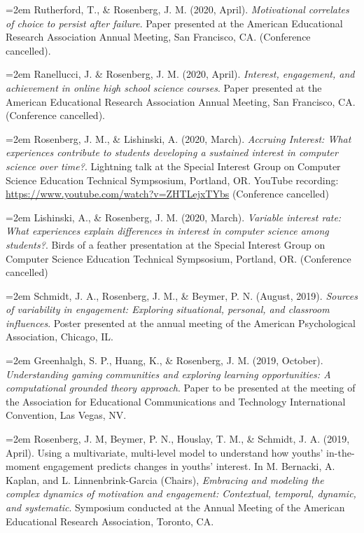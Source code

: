 \documentclass[
  11pt,
]{article}
\begin{document}
\hangindent=2em Rutherford, T., \& Rosenberg, J. M. (2020, April).
\emph{Motivational correlates of choice to persist after failure}. Paper
presented at the American Educational Research Association Annual
Meeting, San Francisco, CA. (Conference cancelled).

\hangindent=2em Ranellucci, J. \& Rosenberg, J. M. (2020, April).
\emph{Interest, engagement, and achievement in online high school
science courses}. Paper presented at the American Educational Research
Association Annual Meeting, San Francisco, CA. (Conference cancelled).

\hangindent=2em Rosenberg, J. M., \& Lishinski, A. (2020, March).
\emph{Accruing Interest: What experiences contribute to students
developing a sustained interest in computer science over time?}.
Lightning talk at the Special Interest Group on Computer Science
Education Technical Sympsosium, Portland, OR. YouTube recording:
\url{https://www.youtube.com/watch?v=ZHTLejxTYbs} (Conference cancelled)

\hangindent=2em Lishinski, A., \& Rosenberg, J. M. (2020, March).
\emph{Variable interest rate: What experiences explain differences in
interest in computer science among students?}. Birds of a feather
presentation at the Special Interest Group on Computer Science Education
Technical Sympsosium, Portland, OR. (Conference cancelled)

\hangindent=2em Schmidt, J. A., Rosenberg, J. M., \& Beymer, P. N.
(August, 2019). \emph{Sources of variability in engagement: Exploring
situational, personal, and classroom influences}. Poster presented at
the annual meeting of the American Psychological Association, Chicago,
IL.

\hangindent=2em Greenhalgh, S. P., Huang, K., \& Rosenberg, J. M. (2019,
October). \emph{Understanding gaming communities and exploring learning
opportunities: A computational grounded theory approach}. Paper to be
presented at the meeting of the Association for Educational
Communications and Technology International Convention, Las Vegas, NV.

\hangindent=2em Rosenberg, J. M, Beymer, P. N., Houslay, T. M., \&
Schmidt, J. A. (2019, April). Using a multivariate, multi-level model to
understand how youths' in-the-moment engagement predicts changes in
youths' interest. In M. Bernacki, A. Kaplan, and L. Linnenbrink-Garcia
(Chairs), \emph{Embracing and modeling the complex dynamics of
motivation and engagement: Contextual, temporal, dynamic, and
systematic}. Symposium conducted at the Annual Meeting of the American
Educational Research Association, Toronto, CA.
\end{document}
